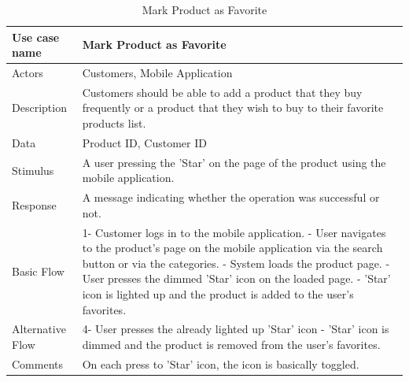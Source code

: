 \documentclass[11pt]{article}
\begin{document}
        \begin{table}[H]
            \begin{centering}
            \begin{tabular}{|p{2.5cm}|p{12cm}|}
            \hline
            Use case name & Mark Product as Favorite \\ \hline
            Actors        & Customers, Mobile Application \\ \hline
            Description   & Customers should be able to add a product that they buy frequently or a product that they wish to buy to their favorite products list. \\ \hline
            Data          & Product ID, Customer ID \\ \hline
            Stimulus      & A user pressing the 'Star' on the page of the product using the mobile application. \\ \hline
            Response      & A message indicating whether the operation was successful or not.  \\ \hline
            Basic Flow    & 
            1- Customer logs in to the mobile application. \newline
            2- User navigates to the product's page on the mobile application via the search button or via the categories. \newline
            3- System loads the product page. \newline
            4- User presses the dimmed 'Star' icon on the loaded page. \newline
            5- 'Star' icon is lighted up and the product is added to the user's favorites. \\ \hline
            Alternative
                Flow      & 
                4- User presses the already lighted up 'Star' icon \newline
                5- 'Star' icon is dimmed and the product is removed from the user's favorites. \\ \hline
                
            Comments      & On each press to 'Star' icon, the icon is basically toggled. \\ \hline
        \end{tabular}
        \caption{Mark Product as Favorite}
        \label{tab_12}
        \end{centering}
        \end{table}    
\end{document}
